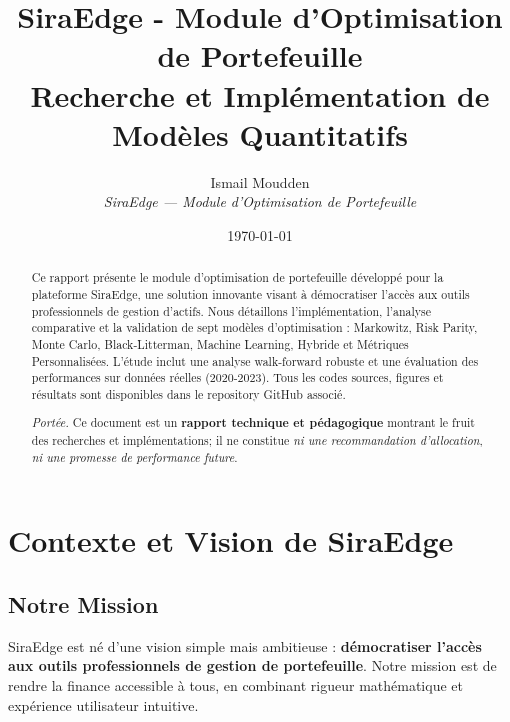 \documentclass[11pt,a4paper]{article}
\begin{document}
\title{\textbf{SiraEdge - Module d'Optimisation de Portefeuille}\\[0.9em]
\large{Recherche et Implémentation de Modèles Quantitatifs}}

\author{Ismail Moudden\\[0.6em]
\textit{SiraEdge — Module d'Optimisation de Portefeuille}}

\date{\today}

\begin{titlepage}
\thispagestyle{empty}
\maketitle
\vspace{2em}

\begin{abstract}
Ce rapport présente le module d'optimisation de portefeuille développé pour la plateforme SiraEdge, une solution innovante visant à démocratiser l'accès aux outils professionnels de gestion d'actifs. Nous détaillons l'implémentation, l'analyse comparative et la validation de sept modèles d'optimisation : Markowitz, Risk Parity, Monte Carlo, Black-Litterman, Machine Learning, Hybride et Métriques Personnalisées. L'étude inclut une analyse walk-forward robuste et une évaluation des performances sur données réelles (2020-2023). Tous les codes sources, figures et résultats sont disponibles dans le repository GitHub associé.
\medskip\par\noindent\textit{Portée.} Ce document est un \textbf{rapport technique et pédagogique} montrant le fruit des recherches et implémentations; il ne constitue \emph{ni une recommandation d'allocation}, \emph{ni une promesse de performance future}.
\end{abstract}

\vfill
\end{titlepage}

\section*{Contexte et Vision de SiraEdge}

\subsection*{Notre Mission}
SiraEdge est né d'une vision simple mais ambitieuse : \textbf{démocratiser l'accès aux outils professionnels de gestion de portefeuille}. Notre mission est de rendre la finance accessible à tous, en combinant rigueur mathématique et expérience utilisateur intuitive.
\end{document}

